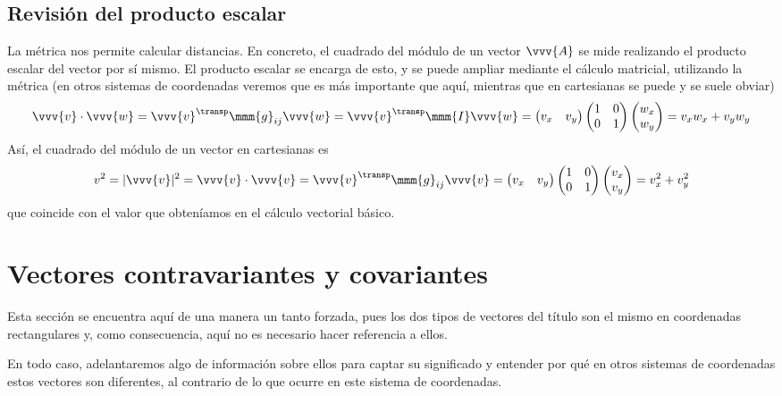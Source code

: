 \subsection{Revisión del producto escalar}
La métrica nos permite calcular distancias. En concreto, el cuadrado del módulo de un
vector $\vvv{A}$ se mide realizando el producto escalar del vector por sí mismo.
El producto escalar se encarga de esto, y se puede ampliar mediante el cálculo
matricial, utilizando la métrica (en otros sistemas de coordenadas veremos que es más
importante que aquí, mientras que en cartesianas se puede y se suele obviar)
\[
  \vvv{v}\cdot\vvv{w}
  = \vvv{v}^\transp \mmm{g}_{ij} \vvv{w}
  = \vvv{v}^\transp \mmm{I} \vvv{w}
  = \begin{pmatrix}
    v_x &  v_y
  \end{pmatrix}
  \begin{pmatrix}
    1 & 0\\
    0 & 1
  \end{pmatrix}
  \begin{pmatrix}
    w_x\\
    w_y
  \end{pmatrix}
  =
  v_xw_x + v_y w_y
\]
Así, el cuadrado del módulo de un vector en cartesianas es
\[
  v^2
  =
  |\vvv{v}|^2
  =
  \vvv{v}\cdot\vvv{v}
  =
  \vvv{v}^\transp \mmm{g}_{ij} \vvv{v}
  =
  \begin{pmatrix}
  v_x &  v_y
\end{pmatrix}
\begin{pmatrix}
  1 & 0\\
  0 & 1
\end{pmatrix}
\begin{pmatrix}
  v_x\\
  v_y
\end{pmatrix}
=
v_x^2 + v_y^2
\]
que coincide con el valor que obteníamos en el cálculo vectorial básico.


\section{Vectores contravariantes y covariantes}
Esta sección se encuentra aquí de una manera un tanto forzada, pues los dos tipos de
vectores del título son el mismo en coordenadas rectangulares y, como consecuencia, aquí
no es necesario hacer referencia a ellos.

En todo caso, adelantaremos algo de información sobre ellos para captar su significado y
entender por qué en otros sistemas de coordenadas estos vectores son diferentes, al
contrario de lo que ocurre en este sistema de coordenadas.

